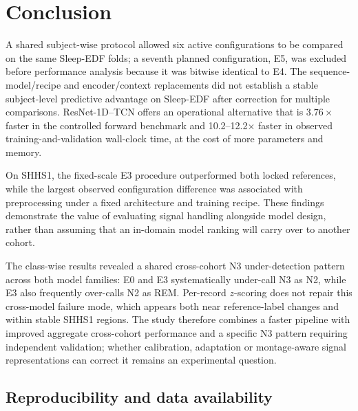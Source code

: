 \documentclass[11pt,a4paper]{article}
\begin{document}
\section{Conclusion}

A shared subject-wise protocol allowed six active configurations to be compared on the same Sleep-EDF
folds; a seventh planned configuration, E5, was excluded before performance analysis because it was
bitwise identical to E4.
The sequence-model/recipe and encoder/context replacements did not establish a stable subject-level
predictive advantage on Sleep-EDF after correction for multiple comparisons. ResNet-1D--TCN offers an operational alternative that is
$3.76\times$ faster in the controlled forward benchmark and 10.2--12.2$\times$ faster in observed
training-and-validation wall-clock time, at the cost of more parameters and memory.

On SHHS1, the fixed-scale E3 procedure outperformed both locked references, while the largest observed
configuration difference was associated with preprocessing under a fixed architecture and training recipe.
These findings demonstrate the value of evaluating signal handling alongside model design, rather than
assuming that an in-domain model ranking will carry over to another cohort.

The class-wise results revealed a shared cross-cohort N3 under-detection pattern across both model
families: E0 and E3 systematically under-call N3 as N2, while E3 also frequently over-calls N2 as REM.
Per-record $z$-scoring does not repair this cross-model failure mode, which appears both near reference-label
changes and within stable SHHS1 regions. The study therefore combines a faster pipeline with improved
aggregate cross-cohort performance and a specific N3 pattern requiring independent validation; whether
calibration, adaptation or montage-aware signal representations can correct it remains an experimental
question.

\subsection*{Reproducibility and data availability}
\end{document}
